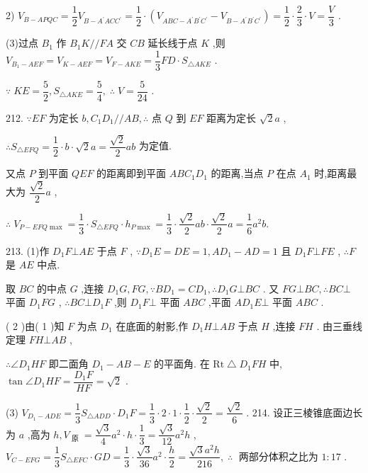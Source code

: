 2) ${V}_{B - {APQC}} = \dfrac{1}{2}{V}_{B - {A}^{\prime }{AC}{C}^{\prime }} = \dfrac{1}{2} \cdot  \left( {{V}_{{ABC} - {A}^{\prime }{B}^{\prime }{C}^{\prime }} - {V}_{B - {A}^{\prime }{B}^{\prime }{C}^{\prime }}}\right)  = \dfrac{1}{2} \cdot  \dfrac{2}{3} \cdot  V = \dfrac{V}{3}$ .

(3)过点 ${B}_{1}$ 作 ${B}_{1}K//{FA}$ 交 ${CB}$ 延长线于点 $K$ ,则 ${V}_{{B}_{1} - {AEF}} = {V}_{K - {AEF}} = {V}_{F - {AKE}} = \dfrac{1}{3}{FD} \cdot  {S}_{\bigtriangleup {AKE}}$ .

$\because \;{KE} = \dfrac{5}{2},{S}_{\bigtriangleup {AKE}} = \dfrac{5}{4},\;\therefore \;V = \dfrac{5}{24}$ .

212. $\because {EF}$ 为定长 $b,{C}_{1}{D}_{1}//{AB},\therefore$ 点 $Q$ 到 ${EF}$ 距离为定长 $\sqrt{2}a$ ,

$\therefore {S}_{\bigtriangleup {EFQ}} = \dfrac{1}{2} \cdot  b \cdot  \sqrt{2}a = \dfrac{\sqrt{2}}{2}{ab}$ 为定值.

又点 $P$ 到平面 ${QEF}$ 的距离即到平面 ${AB}{C}_{1}{D}_{1}$ 的距离,当点 $P$ 在点 ${A}_{1}$ 时,距离最大为 $\dfrac{\sqrt{2}}{2}a$ ,

$\therefore \;{V}_{P - {EFQ}\max } = \dfrac{1}{3} \cdot  {S}_{\bigtriangleup {EFQ}} \cdot  {h}_{P\max } = \dfrac{1}{3} \cdot  \dfrac{\sqrt{2}}{2}{ab} \cdot  \dfrac{\sqrt{2}}{2}a = \dfrac{1}{6}{a}^{2}b.$

213. (1)作 ${D}_{1}F \bot  {AE}$ 于点 $F$ , $\because {D}_{1}E = {DE} = 1,A{D}_{1} - {AD} = 1$ 且 ${D}_{1}F \bot  {FE}$ , $\therefore F$ 是 ${AE}$ 中点.

取 ${BC}$ 的中点 $G$ ,连接 ${D}_{1}G,{FG},\because B{D}_{1} = C{D}_{1},\therefore {D}_{1}G \bot  {BC}$ . 又 ${FG} \bot  {BC},\therefore {BC} \bot$ 平面 ${D}_{1}{FG}$ , $\therefore {BC} \bot  {D}_{1}F$ ,则 ${D}_{1}F \bot$ 平面 ${ABC}$ ,平面 $A{D}_{1}E \bot$ 平面 ${ABC}$ .

( 2 )由( 1 )知 $F$ 为点 ${D}_{1}$ 在底面的射影,作 ${D}_{1}H\bot {AB}$ 于点 $H$ ,连接 ${FH}$ . 由三垂线定理 ${FH}\bot {AB}$ ,

$\therefore \angle {D}_{1}{HF}$ 即二面角 ${D}_{1} - {AB} - E$ 的平面角. 在 $\mathrm{{Rt}}\bigtriangleup {D}_{1}{FH}$ 中, $\tan \angle {D}_{1}{HF} = \dfrac{{D}_{1}F}{HF} = \sqrt{2}$ .

(3) ${V}_{{D}_{1} - {ADE}} = \dfrac{1}{3}{S}_{\bigtriangleup {ADD}} \cdot  {D}_{1}F = \dfrac{1}{3} \cdot  2 \cdot  1 \cdot  \dfrac{1}{2} \cdot  \dfrac{\sqrt{2}}{2} = \dfrac{\sqrt{2}}{6}$ . 214. 设正三棱锥底面边长为 $a$ ,高为 $h,{V}_{\text{ 原 }} = \dfrac{\sqrt{3}}{4}{a}^{2} \cdot  h \cdot  \dfrac{1}{3} = \dfrac{\sqrt{3}}{12}{a}^{2}h$ , ${V}_{C - {EFG}} = \dfrac{1}{3}{S}_{\bigtriangleup {EFC}} \cdot  {GD} = \dfrac{1}{3} \cdot  \dfrac{\sqrt{3}}{36}{a}^{2} \cdot  \dfrac{h}{2} = \dfrac{\sqrt{3}{a}^{2}h}{216},\;\therefore \;$ 两部分体积之比为 $1 : {17}$ .

